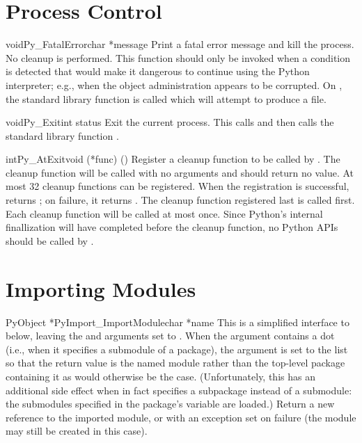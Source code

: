 \documentclass[twoside,openright]{report}
\begin{document}
\section{Process Control}

\begin{cfuncdesc}{void}{Py_FatalError}{char *message}
Print a fatal error message and kill the process.  No cleanup is
performed.  This function should only be invoked when a condition is
detected that would make it dangerous to continue using the Python
interpreter; e.g., when the object administration appears to be
corrupted.  On \UNIX{}, the standard \C{} library function  is 
called which will attempt to produce a  file.
\end{cfuncdesc}

\begin{cfuncdesc}{void}{Py_Exit}{int status}
Exit the current process.  This calls  and then
calls the standard \C{} library function .
\end{cfuncdesc}

\begin{cfuncdesc}{int}{Py_AtExit}{void (*func) ()}
Register a cleanup function to be called by .
The cleanup function will be called with no arguments and should
return no value.  At most 32 cleanup functions can be registered.
When the registration is successful,  returns
; on failure, it returns .  The cleanup function
registered last is called first.  Each cleanup function will be called
at most once.  Since Python's internal finallization will have
completed before the cleanup function, no Python APIs should be called
by .
\end{cfuncdesc}


\section{Importing Modules}

\begin{cfuncdesc}{PyObject *}{PyImport_ImportModule}{char *name}
This is a simplified interface to 
below, leaving the  and  arguments set to
\NULL{}.  When the  argument contains a dot (i.e., when
it specifies a submodule of a package), the  argument is
set to the list \code{['*']} so that the return value is the named
module rather than the top-level package containing it as would
otherwise be the case.  (Unfortunately, this has an additional side
effect when  in fact specifies a subpackage instead of a
submodule: the submodules specified in the package's 
variable are loaded.)  Return a new reference to the imported module,
or \NULL{} with an exception set on failure (the module may still
be created in this case).
\end{cfuncdesc}
\end{document}
